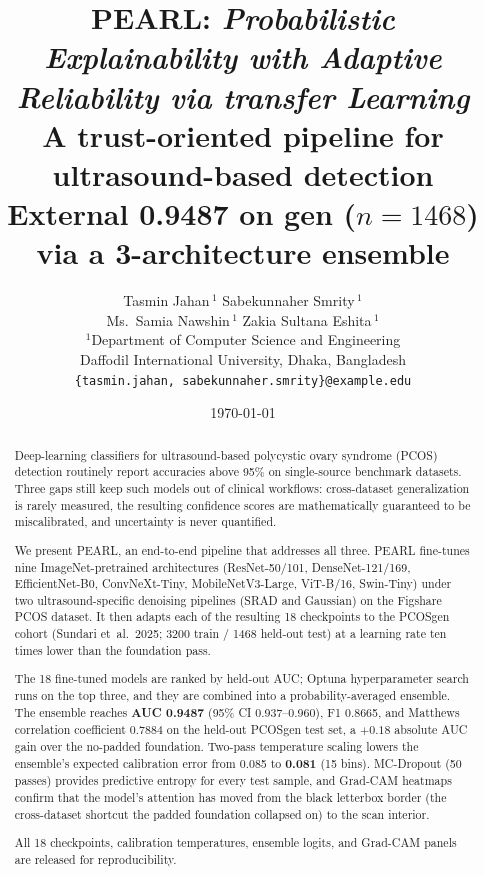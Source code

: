 \documentclass[11pt,twocolumn]{article}
\title{\textbf{PEARL}: \emph{Probabilistic Explainability with Adaptive Reliability via transfer Learning}\\
\large A trust-oriented pipeline for ultrasound-based \PCOS{} detection\\
\normalsize External \AUC{} \textbf{0.9487} on \PCOS{}gen ($n{=}1468$) via a 3-architecture ensemble}
\author{
  Tasmin Jahan\,$^{1}$ \quad Sabekunnaher Smrity\,$^{1}$ \\
  Ms.\ Samia Nawshin\,$^{1}$ \quad Zakia Sultana Eshita\,$^{1}$ \\
  $^{1}$Department of Computer Science and Engineering \\
  Daffodil International University, Dhaka, Bangladesh \\
  \texttt{\{tasmin.jahan, sabekunnaher.smrity\}@example.edu}
}
\date{\today}
\newcommand{\PCOS}{PCOS}
\newcommand{\PEARL}{PEARL}
\newcommand{\SRAD}{SRAD}
\newcommand{\AUC}{AUC}
\newcommand{\GradCAM}{Grad-CAM}
\begin{document}
\maketitle

\begin{abstract}

Deep-learning classifiers for ultrasound-based polycystic ovary syndrome
(\PCOS{}) detection routinely report accuracies above 95\% on single-source
benchmark datasets. Three gaps still keep such models out of clinical
workflows: cross-dataset generalization is rarely measured, the resulting
confidence scores are mathematically guaranteed to be miscalibrated, and
uncertainty is never quantified.

We present \PEARL{}, an end-to-end pipeline that addresses all three.
\PEARL{} fine-tunes nine ImageNet-pretrained architectures (ResNet-50/101,
DenseNet-121/169, EfficientNet-B0, ConvNeXt-Tiny, MobileNetV3-Large,
ViT-B/16, Swin-Tiny) under two ultrasound-specific denoising pipelines
(\SRAD{} and Gaussian) on the Figshare \PCOS{} dataset. It then adapts
each of the resulting 18 checkpoints to the \PCOS{}gen cohort (Sundari
et~al.\ 2025; 3200 train / 1468 held-out test) at a learning rate ten
times lower than the foundation pass.

The 18 fine-tuned models are ranked by held-out \AUC{}; Optuna
hyperparameter search runs on the top three, and they are combined into a
probability-averaged ensemble. The ensemble reaches \textbf{\AUC{} 0.9487}
(95\% CI 0.937--0.960), F1 0.8665, and Matthews correlation coefficient
0.7884 on the held-out \PCOS{}gen test set, a $+0.18$ absolute \AUC{} gain
over the no-padded foundation. Two-pass temperature scaling lowers the
ensemble's expected calibration error from 0.085 to \textbf{0.081} (15
bins). MC-Dropout (50 passes) provides predictive entropy for every test
sample, and \GradCAM{} heatmaps confirm that the model's attention has
moved from the black letterbox border (the cross-dataset shortcut the
padded foundation collapsed on) to the scan interior.

All 18 checkpoints, calibration temperatures, ensemble logits, and
\GradCAM{} panels are released for reproducibility.

\end{abstract}

\end{document}
